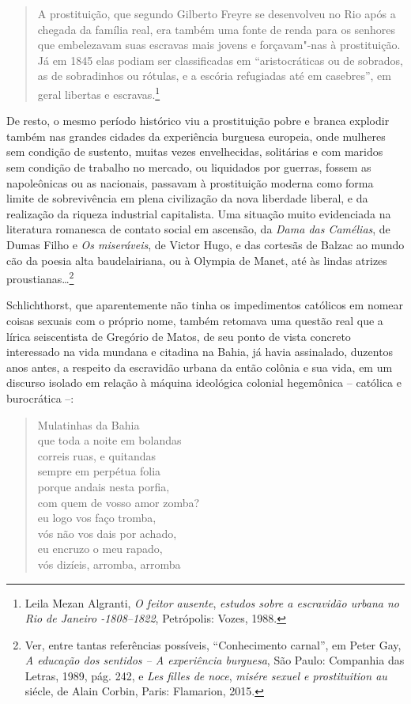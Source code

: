 \begin{quote}
A prostituição, que segundo Gilberto Freyre se desenvolveu no
Rio após a chegada da família real, era também uma fonte de renda para
os senhores que embelezavam suas escravas mais jovens e forçavam"-nas à
prostituição. Já em 1845 elas podiam ser classificadas em
``aristocráticas ou de sobrados, as de sobradinhos ou rótulas, e a
escória refugiadas até em casebres'', em geral libertas e
escravas.\footnote{Leila Mezan Algranti, \emph{O feitor ausente},
  \emph{estudos sobre a escravidão urbana no Rio de Janeiro -1808--1822},
  Petrópolis: Vozes, 1988.}
\end{quote}

De resto, o mesmo período histórico viu a prostituição pobre e branca
explodir também nas grandes cidades da experiência burguesa europeia,
onde mulheres sem condição de sustento, muitas vezes envelhecidas,
solitárias e com maridos sem condição de trabalho no mercado, ou
liquidados por guerras, fossem as napoleônicas ou as nacionais, passavam
à prostituição moderna como forma limite de sobrevivência em plena
civilização da nova liberdade liberal, e da realização da riqueza
industrial capitalista. Uma situação muito evidenciada na literatura
romanesca de contato social em ascensão, da \emph{Dama das Camélias}, de
Dumas Filho e \emph{Os miseráveis}, de Victor Hugo, e das cortesãs de
Balzac ao mundo cão da poesia alta baudelairiana, ou à Olympia de Manet,
até às lindas atrizes proustianas\ldots{}\footnote{Ver, entre tantas
  referências possíveis, ``Conhecimento carnal'', em Peter Gay, \emph{A educação dos sentidos -- A experiência burguesa}, São Paulo: Companhia
  das Letras, 1989, pág. 242, e \emph{Les filles de noce}, \emph{misére
  sexuel e prostituition au } siécle, de Alain Corbin, Paris:
  Flamarion, 2015.}

Schlichthorst, que aparentemente não tinha os impedimentos católicos em
nomear coisas sexuais com o próprio nome, também retomava uma questão
real que a lírica seiscentista de Gregório de Matos, de seu ponto de
vista concreto interessado na vida mundana e citadina na Bahia, já havia
assinalado, duzentos anos antes, a respeito da escravidão urbana da
então colônia e sua vida, em um discurso isolado em relação à máquina
ideológica colonial hegemônica -- católica e burocrática --:

\begin{verse}
Mulatinhas da Bahia\\
que toda a noite em bolandas\\
correis ruas, e quitandas\\
sempre em perpétua folia\\
porque andais nesta porfia,\\
com quem de vosso amor zomba?\\
eu logo vos faço tromba,\\
vós não vos dais por achado,\\
eu encruzo o meu rapado,\\
vós dizíeis, arromba, arromba
\end{verse}

